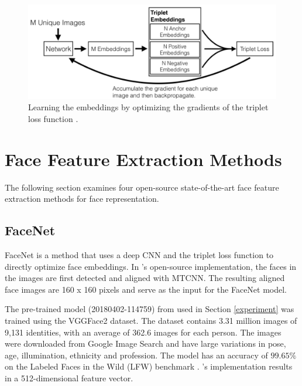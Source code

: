\documentclass[12pt,english]{article}
\begin{document}
\begin{figure}[!tbp]
 \centering
    \includegraphics[width=0.6\columnwidth]{figures/openface_architecture.png}
    \caption{Learning the embeddings by optimizing the gradients of the triplet loss function \cite{amos}.}
	\label{fig:loss}
\end{figure}
 
\section{Face Feature Extraction Methods}
\label{facemethod}
\quad
The following section examines four open-source state-of-the-art face feature extraction methods for face representation.

\subsection{FaceNet}
\quad
FaceNet is a method that uses a deep CNN and the triplet loss function to directly optimize face embeddings. In \cite{sandberg}'s open-source implementation, the faces in the images are first detected and aligned with MTCNN. The resulting aligned face images are 160 x 160 pixels and serve as the input for the FaceNet model. %


The pre-trained model (20180402-114759) from \cite{sandberg} used in Section \ref{experiment} was trained using the VGGFace2 dataset. The dataset contains 3.31 million images of 9,131 identities, with an average of 362.6 images for each person. The images were downloaded from Google Image Search and have large variations in pose, age, illumination, ethnicity and profession. The model has an accuracy of $99.65\%$ on the Labeled Faces in the Wild (LFW) benchmark \cite{sandberg}. \cite{sandberg}'s implementation results in a 512-dimensional feature vector.
\end{document}
